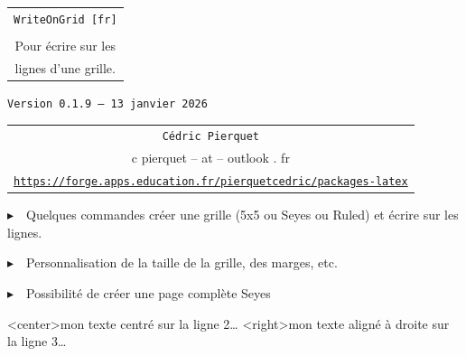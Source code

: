 \documentclass[a4paper]{article}
\def\TPversion{0.1.9}
\def\TPdate{13 janvier 2026}
\begin{document}
\pagestyle{fancy}

\thispagestyle{empty}

\vspace{2cm}

\begin{center}
	\begin{minipage}{0.75\linewidth}
	\begin{tcolorbox}[colframe=yellow,colback=yellow!15]
		\begin{center}
			\begin{tabular}{c}
				{\Huge \texttt{WriteOnGrid [fr]}}\\
				\\
				{\LARGE Pour écrire sur les} \\
				{\LARGE lignes d'une grille.}
			\end{tabular}
			
			\medskip
			
			{\small \texttt{Version \TPversion{} -- \TPdate}}
		\end{center}
	\end{tcolorbox}
\end{minipage}
\end{center}

\vspace{0.5cm}

\begin{center}
	\begin{tabular}{c}
	\texttt{Cédric Pierquet}\\
	{\ttfamily c pierquet -- at -- outlook . fr}\\
	\texttt{\url{https://forge.apps.education.fr/pierquetcedric/packages-latex}}
\end{tabular}
\end{center}

\vspace{0.5cm}

{$\blacktriangleright$~~Quelques commandes créer une grille (5x5 ou Seyes ou Ruled) et écrire \og sur \fg{} les lignes.}

\smallskip

{$\blacktriangleright$~~Personnalisation de la taille de la grille, des marges, etc.}

\smallskip

{$\blacktriangleright$~~Possibilité de créer une page complète Seyes}

\vspace{1cm}

\begin{center}
	\begin{EnvQuadrillage}[NbCarreaux=22x8]
	\EcrireLigne<center>{mon texte centré sur la ligne 2\ldots}
	\EcrireLigne<right>{mon texte aligné à droite sur la ligne 3\ldots}
	\PasseLigne
\end{EnvQuadrillage}
\end{center}
\end{document}
